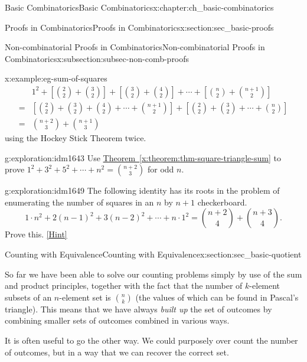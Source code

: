 \documentclass[oneside,10pt,]{book}
\numberwithin{equation}{chapter}
\newcommand{\amp}{&}
\begin{document}
\begin{chapterptx}{Basic Combinatorics}{}{Basic Combinatorics}{}{}{x:chapter:ch_basic-combinatorics}
\begin{sectionptx}{Proofs in Combinatorics}{}{Proofs in Combinatorics}{}{}{x:section:sec_basic-proofs}
\begin{subsectionptx}{Non-combinatorial Proofs in Combinatorics}{}{Non-combinatorial Proofs in Combinatorics}{}{}{x:subsection:subsec-non-comb-proofs}
\begin{example}{}{x:example:eg-sum-of-squares}
\begin{align*}
\amp 1^2 + \left[\binom{2}{2}+\binom{3}{2}\right]+ \left[\binom{3}{2} + \binom{4}{2}\right] + \cdots + \left[\binom{n}{2} + \binom{n+1}{2}\right] \\
= \amp \left[\binom{2}{2} + \binom{3}{2} + \binom{4}{2} + \cdots + \binom{n+1}{2}\right] + \left[\binom{2}{2} + \binom{3}{2} + \cdots + \binom{n}{2}\right] \\
= \amp \binom{n+2}{3} + \binom{n+1}{3}
\end{align*}
using the Hockey Stick Theorem twice.%
\end{example}
\begin{exploration}{}{g:exploration:idm1643}%
Use \hyperref[x:theorem:thm-square-triangle-sum]{Theorem~\ref{x:theorem:thm-square-triangle-sum}} to prove \(1^2 + 3^2 + 5^2 + \cdots + n^2 = \binom{n+2}{3}\) for odd \(n\).%
\end{exploration}
\begin{exploration}{}{g:exploration:idm1649}%
The following identity has its roots in the problem of enumerating the number of squares in an \(n\) by \(n+1\) checkerboard.%
\begin{equation*}
1\cdot n^2 + 2(n-1)^2 + 3(n-2)^2 + \cdots + n\cdot 1^2 = \binom{n+2}{4} + \binom{n+3}{4}\text{.}
\end{equation*}
Prove this.%
\space\hspace*{0pt}\hfill{\tiny\hyperlink{g:hint:idm1655-back}{[Hint]}}\end{exploration}
\end{subsectionptx}
\end{sectionptx}
%
%
\typeout{************************************************}
\typeout{************************************************}
%
\begin{sectionptx}{Counting with Equivalence}{}{Counting with Equivalence}{}{}{x:section:sec_basic-quotient}
\begin{introduction}{}%
So far we have been able to solve our counting problems simply by use of the sum and product principles, together with the fact that the number of \(k\)-element subsets of an \(n\)-element set is \(\binom{n}{k}\) (the values of which can be found in Pascal's triangle). This means that we have always \emph{built up} the set of outcomes by combining smaller sets of outcomes combined in various ways.%
\par
It is often useful to go the other way.  We could purposely over count the number of outcomes, but in a way that we can recover the correct set.%

\end{introduction}
\end{sectionptx}
\end{chapterptx}
\end{document}
